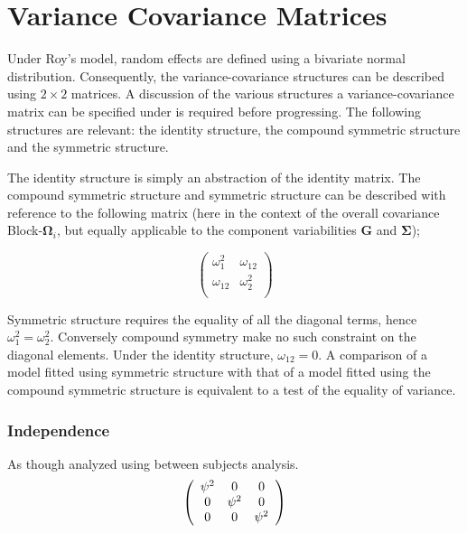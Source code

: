 \documentclass[12pt, a4paper]{report}
\theoremstyle{plain}
\theoremstyle{definition}
\theoremstyle{remark}
\begin{document}
\section{Variance Covariance Matrices }

Under Roy's model, random effects are defined using a bivariate normal distribution. Consequently, the variance-covariance structures can be described using $2 \times 2$  matrices. A discussion of the various structures a variance-covariance matrix can be specified under is required before progressing. The following structures are relevant: the identity structure, the compound symmetric structure and the symmetric structure.

The identity structure is simply an abstraction of the identity matrix. The compound symmetric structure and symmetric structure can be described with reference to the following matrix (here in the context of the overall covariance Block-$\boldsymbol{\Omega}_i$, but equally applicable to the component variabilities $\boldsymbol{G}$ and $\boldsymbol{\Sigma}$);

\[\left( \begin{array}{cc}
\omega^2_1  & \omega_{12} \\
\omega_{12} & \omega^2_2 \\
\end{array}\right) \]

Symmetric structure requires the equality of all the diagonal terms, hence $\omega^2_1 = \omega^2_2$. Conversely compound symmetry make no such constraint on the diagonal elements. Under the identity structure, $\omega_{12} = 0$.
A comparison of a model fitted using symmetric structure with that of a model fitted using the compound symmetric structure is equivalent to a test of the equality of variance.





\subsubsection{Independence}

As though analyzed using between subjects analysis.
\[
\left(
\begin{array}{c c c}
\psi^2 & 0 & 0   \\
0 & \psi^2 & 0   \\
0 & 0 & \psi^2   \\
\end{array}%
\right)
\]
\end{document}
